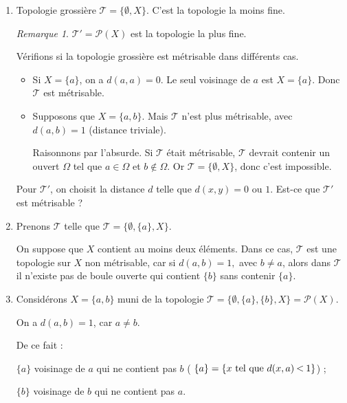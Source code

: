 \documentclass[french]{book}
\theoremstyle{definition}
\theoremstyle{remark}
\newtheorem*{remark}{Remarque}
\newcommand{\lesss}{\rotatebox[origin=c]{90}{$\land$}}
\newcommand{\less}{\ \lesss\ }
\begin{document}
\begin{enumerate}
  \item Topologie grossière $\mathscr{T}= \{ \emptyset, X \} $. C'est la topologie la moins fine.

  \begin{remark}
    $\mathscr{T}' = \mathscr{P}(X)  $ est la topologie la plus fine.
  \end{remark}

  Vérifions si la topologie grossière est métrisable dans différents cas.
  \begin{itemize}
    \item Si $X = \{ a \} $, on a $d(a,a) =0$. Le seul voisinage de $a$ est $X = \{ a \} $. Donc $\mathscr{T} $ est métrisable.
    \item Supposons que $X = \{ a,b \} $. Mais $\mathscr{T} $ n'est plus métrisable, avec $d(a,b) =1$ (distance triviale).

    Raisonnons par l'absurde. Si $\mathscr{T} $ était métrisable, $\mathscr{T} $ devrait contenir un ouvert $\Omega$ tel que $a \in \Omega$ et $b \notin \Omega$. Or $\mathscr{T} = \{ \emptyset, X \} $, donc c'est impossible.
  \end{itemize}

  Pour $\mathscr{T}' $, on choisit la distance $d$ telle que $d(x,y) = 0 \text{ ou } 1$. Est-ce que $\mathscr{T}' $ est métrisable ?

  \item Prenons $\mathscr{T} $ telle que $\mathscr{T} = \{ \emptyset, \{ a \} , X \} $.

  On suppose que $X$ contient au moins deux éléments. Dans ce cas, $\mathscr{T} $ est une topologie sur $X$ non métrisable, car si $d(a,b)=1,$ avec $ b \neq a$, alors dans $\mathscr{T} $ il n'existe pas de boule ouverte qui contient $\{ b \} $ sans contenir $\{ a \} $.

  \item Considérons $X = \{ a,b \}$ muni de la topologie $  \mathscr{T} = \{ \emptyset, \{ a \}, \{ b \}, X \} = \mathscr{P}(X)  $.

  On a $d(a,b) = 1$, car $a \neq b$.

  De ce fait :

  $\{ a \} $ voisinage de $a$ qui ne contient pas $b$ ( $\{ a \} = \{ x \text{ tel que } d(x,a) \less 1 \} $) ;

  $\{ b \} $ voisinage de $b$ qui ne contient pas $a$.




\end{enumerate}
\end{document}
